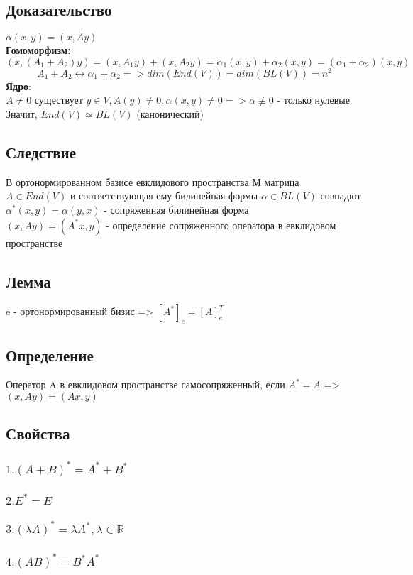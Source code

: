 \documentclass[12pt]{article}
\begin{document}
\subsection*{Доказательство}
$\alpha(x,y) = (x, Ay)$
\[\]
\textbf{Гомоморфизм:}
\[
(x, (A_1 + A_2)y) = (x, A_1 y) + (x,A_2y) = \alpha_1(x,y)+ \alpha_2(x,y) = (\alpha_1 + \alpha_2)(x,y)
\]
\[
A_1 + A_2 \longleftrightarrow \alpha_1 + \alpha_2 => dim(End(V)) = dim (BL(V)) = n^2
\]
\textbf{Ядро}:
\[\]
$A \ne 0$ существует $y \in V, A(y) \ne 0, \alpha(x,y) \ne 0 => \alpha \not\equiv 0$ - только нулевые 
\[\]
Значит, $End(V) \simeq BL(V)$ (канонический)

\subsection*{Следствие}
 В ортонормированном базисе евклидового пространства М матрица
 $A \in End(V)$ и соответствующая ему билинейная формы $\alpha \in BL(V)$ совпадют
 \[\]
 $\alpha^* (x,y) = \alpha(y,x)$ - сопряженная билинейная форма 
 \[\]
 $(x, Ay) = (A^*x,y)$ - определение сопряженного оператора в евклидовом пространстве

 \subsection*{Лемма}
 e - ортонормированный бизис => $[A^*]_e = [A]_e^T$

 \subsection*{Определение}
 Оператор A в евклидовом пространстве самосопряженный, если $A^* = A$ => $(x,Ay)= (Ax,y)$

\subsection*{Свойства}
\subsubsection*{
$1. (A+B)^* = A^*+B^*$}
\subsubsection*{
$2. E^* = E$}
\subsubsection*{
$3. (\lambda A)^* = \lambda A^*, \lambda \in \mathbb{R}$}
\subsubsection*{
$4. (AB)^* = B^*A^*$}
\end{document}
